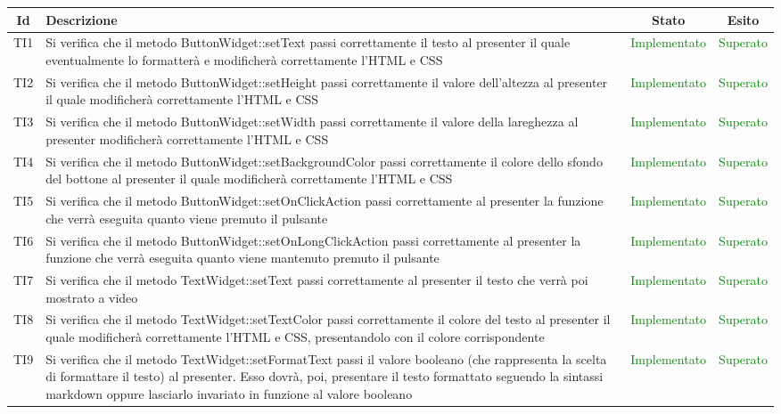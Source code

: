 \begin{center}
	\begin{longtable}{|c|>{\centering}m{10cm}|c|c|}\hline
		Id & Descrizione & Stato & Esito\\ \hline
		TI1 & Si verifica che il metodo ButtonWidget::setText passi correttamente il testo al presenter il quale eventualmente lo formatterà e modificherà correttamente l'HTML e CSS & \textcolor{Green}{Implementato} & \textcolor{Green}{Superato} \\ \hline
		TI2 & Si verifica che il metodo ButtonWidget::setHeight passi correttamente il valore dell'altezza al presenter il quale modificherà correttamente l'HTML e CSS & \textcolor{Green}{Implementato} & \textcolor{Green}{Superato} \\ \hline
		TI3 & Si verifica che il metodo ButtonWidget::setWidth passi correttamente il valore della lareghezza al presenter modificherà correttamente l'HTML e CSS & \textcolor{Green}{Implementato} & \textcolor{Green}{Superato} \\ \hline
		TI4 & Si verifica che il metodo ButtonWidget::setBackgroundColor passi correttamente il colore dello sfondo del bottone al presenter il quale modificherà correttamente l'HTML e CSS & \textcolor{Green}{Implementato} & \textcolor{Green}{Superato} \\ \hline
		TI5 & Si verifica che il metodo ButtonWidget::setOnClickAction passi correttamente al presenter la funzione che verrà eseguita quanto viene premuto il pulsante & \textcolor{Green}{Implementato} & \textcolor{Green}{Superato} \\ \hline
		TI6 & Si verifica che il metodo ButtonWidget::setOnLongClickAction passi correttamente al presenter la funzione che verrà eseguita quanto viene mantenuto premuto il pulsante & \textcolor{Green}{Implementato} & \textcolor{Green}{Superato} \\ \hline
		TI7 & Si verifica che il metodo TextWidget::setText passi correttamente al presenter il testo che verrà poi mostrato a video & \textcolor{Green}{Implementato} & \textcolor{Green}{Superato} \\ \hline
		TI8 & Si verifica che il metodo TextWidget::setTextColor passi correttamente il colore del testo al presenter il quale modificherà correttamente l'HTML e CSS, presentandolo con il colore corrispondente & \textcolor{Green}{Implementato} & \textcolor{Green}{Superato} \\ \hline
		TI9 & Si verifica che il metodo TextWidget::setFormatText passi il valore booleano (che rappresenta la scelta di formattare il testo) al presenter. Esso dovrà, poi, presentare il testo formattato seguendo la sintassi markdown oppure lasciarlo invariato in funzione al valore booleano & \textcolor{Green}{Implementato} & \textcolor{Green}{Superato} \\ \hline

\end{longtable}
\end{center}
